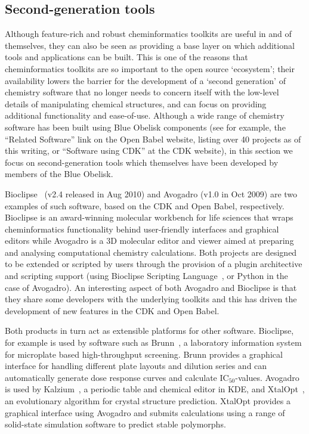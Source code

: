 \documentclass[10pt]{bmc_article}
\newenvironment{bmcformat}{\fussy\setboolean{publ}{true}}{\fussy}
\begin{document}
\begin{bmcformat}
\subsection*{Second-generation tools}

Although feature-rich and robust cheminformatics toolkits are useful
in and of themselves, they can also be seen as providing a base layer
on which additional tools and applications can be built. This is one
of the reasons that cheminformatics toolkits are so important to the
open source `ecosystem'; their availability lowers the barrier for the
development of a `second generation' of chemistry software that no
longer needs to concern itself with the low-level details of
manipulating chemical structures, and can focus on providing
additional functionality and ease-of-use. Although a wide range of
chemistry software has been built using Blue Obelisk
components (see for example, the ``Related Software'' link on the Open
Babel website,\cite{WebOBRelated} listing over 40 projects as of this writing, 
or ``Software using CDK'' at the CDK website), in this
section we focus on second-generation tools which themselves have been
developed by members of the Blue Obelisk. 

Bioclipse~\cite{Spjuth:2007fk} (v2.4 released in Aug 2010) and Avogadro
\cite{WebAvogadro} (v1.0 in Oct 2009) are two examples of such software, based
on the CDK and Open Babel, respectively. Bioclipse is an award-winning
molecular workbench for life sciences
that wraps cheminformatics functionality behind user-friendly interfaces and
graphical editors while Avogadro is a 3D molecular editor and viewer aimed at
preparing and analysing computational chemistry calculations. Both
projects are designed to be extended or scripted by users through
the provision of a plugin architective and scripting support (using
Bioclipse Scripting Language~\cite{Bioclipse2}, or Python in the case
of Avogadro). An interesting aspect of both Avogadro and Bioclipse is
that they share some developers with the underlying toolkits and this
has driven the development of new features in the CDK and Open Babel.

Both products in turn act as extensible platforms for other
software. Bioclipse, for example is used by software
such as Brunn~\cite{Alvarsson:2011fk}, a laboratory information system for
microplate based high-throughput screening. Brunn provides a graphical interface
for handling different plate layouts and dilution series and can automatically
generate dose response curves and calculate IC$_{50}$-values. Avogadro
is used by Kalzium~\cite{WebKalzium}, a periodic table and chemical editor in KDE,
and XtalOpt~\cite{WebXtalOpt}\cite{Lonie2011}, an evolutionary
algorithm for crystal structure prediction. XtalOpt provides a
graphical interface using Avogadro and submits calculations using a
range of solid-state simulation software to predict stable polymorphs.


\end{bmcformat}
\end{document}
